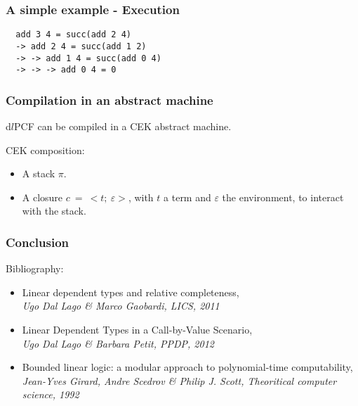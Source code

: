 \documentclass{beamer}
\begin{document}
\begin{frame}[fragile]
  \frametitle{A simple example - Execution }

\begin{verbatim}
  add 3 4 = succ(add 2 4)
  -> add 2 4 = succ(add 1 2)
  -> -> add 1 4 = succ(add 0 4)
  -> -> -> add 0 4 = 0
\end{verbatim}
\end{frame}

\begin{frame}
  \frametitle{Compilation in an abstract machine}

  d$l$PCF can be compiled in a CEK abstract machine.

  \medskip

  CEK composition:
  \begin{itemize}
  \item A stack $\pi$.
  \item A closure $c~=~<t;~\varepsilon >$, with $t$ a term and $\varepsilon$ the
    environment, to interact with the stack.
  \end{itemize}

\end{frame}

\begin{frame}
  \frametitle{Conclusion}

  Bibliography:
  \begin{itemize}
    \item Linear dependent types and relative completeness, \\
      \emph{Ugo Dal Lago \& Marco Gaobardi, LICS, 2011}
    \item Linear Dependent Types in a Call-by-Value Scenario, \\ 
      \emph{Ugo Dal Lago \& Barbara Petit, PPDP, 2012}
    \item Bounded linear logic: a modular approach to polynomial-time
      computability, \\
      \emph{Jean-Yves Girard, Andre Scedrov \& Philip J. Scott, Theoritical computer science, 1992} 
  \end{itemize}

\end{frame}
\end{document}

